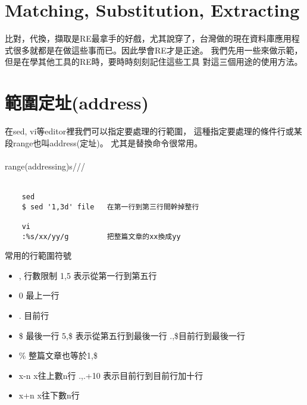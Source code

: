     \section{Matching, Substitution, Extracting}
	比對，代換，擷取是RE最拿手的好戲，尤其說穿了，台灣做的現在資料庫應用程
	式很多就都是在做這些事而已。因此學會RE才是正途。
	我們先用一些來做示範，但是在學其他工具的RE時，要時時刻刻記住這些工具
	對這三個用途的使用方法。
    \section{範圍定址(address)}
	在sed, vi等editor裡我們可以指定要處理的行範圍，
	這種指定要處理的條件行或某段range也叫address(定址)。
	尤其是替換命令很常用。\\\\
	range(addressing)s/// \\\\
	\begin{verbatim}
	sed
	$ sed '1,3d' file   在第一行到第三行間幹掉整行

	vi
	:%s/xx/yy/g         把整篇文章的xx換成yy
	\end{verbatim}
	常用的行範圍符號
	\begin{itemize}
	\item ,   行數限制  1,5  表示從第一行到第五行
	\item 0   最上一行
	\item .   目前行
	\item \$  最後一行  5,\$ 表示從第五行到最後一行  .,\$目前行到最後一行
	\item \%  整篇文章也等於1,\$
	\item x-n x往上數n行 .,.+10  表示目前行到目前行加十行
	\item x+n x往下數n行
	\end{itemize}
